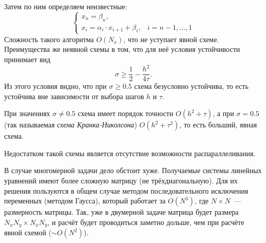 Затем по ним определяем неизвестные:
$$
    \begin{cases}
        x_n = \beta_n,\\
        x_i = \alpha_i \cdot x_{i+1} + \beta_i, & i = n-1, \ldots, 1
    \end{cases}
$$
Сложность такого алгоритма $O(N_x)$, что не уступает явной схеме.
Преимущества же неявной схемы в том, что для неё условия устойчивости принимает вид
\begin{equation*}
    \sigma \geqslant \frac{1}{2} - \frac{h^2}{4\tau}.
\end{equation*}
Из этого условия видно, что при $\sigma \ge 0.5$ схема безусловно устойчива, то есть устойчива вне зависимости от выбора шагов $h$ и $\tau$.

При значениях $\sigma \ne 0.5$ схема имеет порядок точности $O(h^2 + \tau)$, а при $\sigma = 0.5$ (так называемая \emph{схема Кранка-Николсона}) $O(h^2 + \tau^2)$, то есть больший, явная схема.

Недостатком такой схемы является отсутствие возможности распараллеливания.

В случае многомерной задачи дело обстоит хуже.
Получаемые системы линейных уравнений имеют более сложную матрицу (не трёхдиагональную). Для их решения пользуются в общем случае методом последовательного исключения переменных (методом Гаусса), который работает за $O(N^3)$, где $N \times N$~--- размерность матрицы.
Так, уже в двумерной задаче матрица будет размера $N_xN_y \times N_x N_y$, и расчёт будет проводиться заметно дольше, чем при расчёте явной схемой ($\sim O(N^2)$).